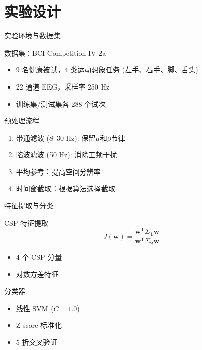 
\section{实验设计}

\begin{frame}{实验环境与数据集}
    \begin{block}{数据集：BCI Competition IV 2a}
        \begin{itemize}
            \item 9 名健康被试，4 类运动想象任务 (左手、右手、脚、舌头)
            \item 22 通道 EEG，采样率 250 Hz
            \item 训练集/测试集各 288 个试次
        \end{itemize}
    \end{block}
    
    \vspace{0.3cm}
    \begin{block}{预处理流程}
        \begin{enumerate}
            \item 带通滤波 (8--30 Hz): 保留$\mu$和$\beta$节律
            \item 陷波滤波 (50 Hz): 消除工频干扰
            \item 平均参考：提高空间分辨率
            \item 时间窗截取：根据算法选择截取
        \end{enumerate}
    \end{block}
\end{frame}

\begin{frame}{特征提取与分类}
    \begin{block}{CSP 特征提取}
        \[
        J(\mathbf{w}) = \frac{\mathbf{w}^{\text{T}} \Sigma_1 \mathbf{w}}{\mathbf{w}^{\text{T}} \Sigma_2 \mathbf{w}}
        \]
        \begin{itemize}
            \item 4 个 CSP 分量
            \item 对数方差特征
        \end{itemize}
    \end{block}
    
    \vspace{0.3cm}
    \begin{block}{分类器}
        \begin{itemize}
            \item 线性 SVM ($C = 1.0$)
            \item Z-score 标准化
            \item 5 折交叉验证
        \end{itemize}
    \end{block}
\end{frame}

